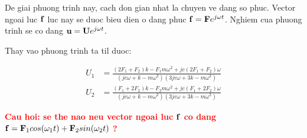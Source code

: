 De giai phuong trinh nay, cach don gian nhat la chuyen ve dang so phuc. Vector ngoai luc $\bf f$ luc nay se duoc bieu dien o dang phuc ${\bf f} = {\bf F}e^{j\omega t}$. Nghiem cua phuong trinh se co dang ${\bf u} = {\bf U}e^{j\omega t}$.

Thay vao phuong trinh ta til duoc:

\begin{equation}\label{eq_nghiemphuc}
    \begin{aligned}
        {U}_1 &=\frac{\left(2 F_1+F_2\right) k-F_1 m \omega^2+j c\left(2 F_1+F_2\right) \omega}{\left(j c \omega+k-m \omega^2\right)\left(3 j c \omega+3 k-m \omega^2\right)}\\
        {U}_2 &=\frac{\left(F_1+2 F_2\right) k-F_2 m \omega^2+j c\left(F_1+2 F_2\right) \omega}{\left(j c \omega+k-m \omega^2\right)\left(3 j c \omega+3 k-m \omega^2\right)}
    \end{aligned}
\end{equation}

\textbf{\textcolor{red}{Cau hoi: se the nao neu vector ngoai luc ${\bf f}$ co dang ${\bf f} = {\bf F}_1cos(\omega_1t) + {\bf F}_2sin(\omega_2t)$ ?}}

